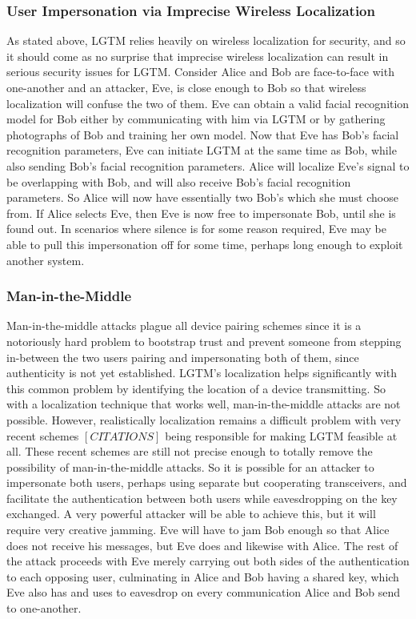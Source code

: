 \documentclass[12pt]{report}
\begin{document}
\subsubsection{User Impersonation via Imprecise Wireless Localization}
As stated above, LGTM relies heavily on wireless localization for security, and so it should come as no surprise that imprecise wireless localization can result in serious security issues for LGTM. Consider Alice and Bob are face-to-face with one-another and an attacker, Eve, is close enough to Bob so that wireless localization will confuse the two of them. Eve can obtain a valid facial recognition model for Bob either by communicating with him via LGTM or by gathering photographs of Bob and training her own model. Now that Eve has Bob's facial recognition parameters, Eve can initiate LGTM at the same time as Bob, while also sending Bob's facial recognition parameters. Alice will localize Eve's signal to be overlapping with Bob, and will also receive Bob's facial recognition parameters. So Alice will now have essentially two Bob's which she must choose from. If Alice selects Eve, then Eve is now free to impersonate Bob, until she is found out. In scenarios where silence is for some reason required, Eve may be able to pull this impersonation off for some time, perhaps long enough to exploit another system. \\

\subsubsection{Man-in-the-Middle}
Man-in-the-middle attacks plague all device pairing schemes since it is a notoriously hard problem to bootstrap trust and prevent someone from stepping in-between the two users pairing and impersonating both of them, since authenticity is not yet established. LGTM's localization helps significantly with this common problem by identifying the location of a device transmitting. So with a localization technique that works well, man-in-the-middle attacks are not possible. However, realistically localization remains a difficult problem with very recent schemes $[CITATIONS]$ being responsible for making LGTM feasible at all. These recent schemes are still not precise enough to totally remove the possibility of man-in-the-middle attacks. So it is possible for an attacker to impersonate both users, perhaps using separate but cooperating transceivers, and facilitate the authentication between both users while eavesdropping on the key exchanged. A very powerful attacker will be able to achieve this, but it will require very creative jamming. Eve will have to jam Bob enough so that Alice does not receive his messages, but Eve does and likewise with Alice. The rest of the attack proceeds with Eve merely carrying out both sides of the authentication to each opposing user, culminating in Alice and Bob having a shared key, which Eve also has and uses to eavesdrop on every communication Alice and Bob send to one-another. \\
\end{document}
